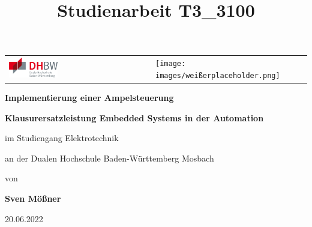 \documentclass[12pt,oneside,a4paper]{scrreprt}
\title{Studienarbeit T3\_3100}
\begin{document}
	\begin{titlepage}
		\begin{table}[H]
			\begin{tabular}{lll}
				\includegraphics[width=0.35\textwidth]{images/DHBW-Logo.png} & \texttt{[image: images/weißerplaceholder.png]}  &                        
			\end{tabular}
		\end{table}
		
		\vspace{2\baselineskip}
		\begin{center}
			{\Large \textbf{Implementierung einer Ampelsteuerung
}}
		\end{center}
		
		
		\vspace{2\baselineskip}
		\begin{center}
			{\large \textbf{Klausurersatzleistung Embedded Systems in der Automation}}
		\end{center}
		
		
		\vspace{2\baselineskip}
		\begin{center}
			im Studiengang Elektrotechnik
		\end{center}
		
		
		\begin{center}
			an der Dualen Hochschule Baden-Württemberg Mosbach
		\end{center}
		
		
		\vspace{0.5\baselineskip}
		\begin{center}
			von
		\end{center}
		
		
		\vspace{0.5\baselineskip}
		\begin{center}
			\textbf{Sven Mößner}
		\end{center}
		
		
		\vspace{1\baselineskip}
		\begin{center}
			20.06.2022
		\end{center}
		

\end{titlepage}
\end{document}
